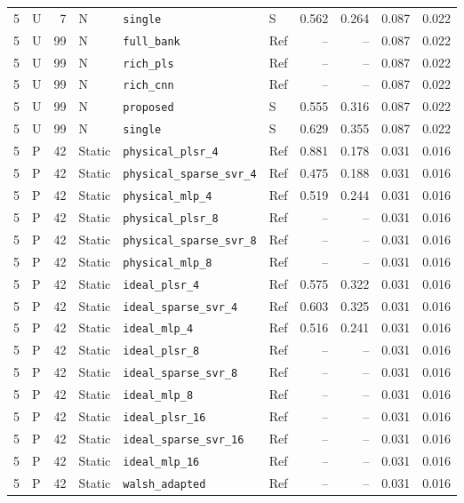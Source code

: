 \documentclass[10pt,a4paper]{article}
\begin{document}
\begin{longtable}{rlrlllrrrr}
5 & U & 7 & N & \texttt{single} & S & 0.562 & 0.264 & 0.087 & 0.022 \\
5 & U & 99 & N & \texttt{full\_bank} & Ref & -- & -- & 0.087 & 0.022 \\
5 & U & 99 & N & \texttt{rich\_pls} & Ref & -- & -- & 0.087 & 0.022 \\
5 & U & 99 & N & \texttt{rich\_cnn} & Ref & -- & -- & 0.087 & 0.022 \\
5 & U & 99 & N & \texttt{proposed} & S & 0.555 & 0.316 & 0.087 & 0.022 \\
5 & U & 99 & N & \texttt{single} & S & 0.629 & 0.355 & 0.087 & 0.022 \\
5 & P & 42 & Static & \texttt{physical\_plsr\_4} & Ref & 0.881 & 0.178 & 0.031 & 0.016 \\
5 & P & 42 & Static & \texttt{physical\_sparse\_svr\_4} & Ref & 0.475 & 0.188 & 0.031 & 0.016 \\
5 & P & 42 & Static & \texttt{physical\_mlp\_4} & Ref & 0.519 & 0.244 & 0.031 & 0.016 \\
5 & P & 42 & Static & \texttt{physical\_plsr\_8} & Ref & -- & -- & 0.031 & 0.016 \\
5 & P & 42 & Static & \texttt{physical\_sparse\_svr\_8} & Ref & -- & -- & 0.031 & 0.016 \\
5 & P & 42 & Static & \texttt{physical\_mlp\_8} & Ref & -- & -- & 0.031 & 0.016 \\
5 & P & 42 & Static & \texttt{ideal\_plsr\_4} & Ref & 0.575 & 0.322 & 0.031 & 0.016 \\
5 & P & 42 & Static & \texttt{ideal\_sparse\_svr\_4} & Ref & 0.603 & 0.325 & 0.031 & 0.016 \\
5 & P & 42 & Static & \texttt{ideal\_mlp\_4} & Ref & 0.516 & 0.241 & 0.031 & 0.016 \\
5 & P & 42 & Static & \texttt{ideal\_plsr\_8} & Ref & -- & -- & 0.031 & 0.016 \\
5 & P & 42 & Static & \texttt{ideal\_sparse\_svr\_8} & Ref & -- & -- & 0.031 & 0.016 \\
5 & P & 42 & Static & \texttt{ideal\_mlp\_8} & Ref & -- & -- & 0.031 & 0.016 \\
5 & P & 42 & Static & \texttt{ideal\_plsr\_16} & Ref & -- & -- & 0.031 & 0.016 \\
5 & P & 42 & Static & \texttt{ideal\_sparse\_svr\_16} & Ref & -- & -- & 0.031 & 0.016 \\
5 & P & 42 & Static & \texttt{ideal\_mlp\_16} & Ref & -- & -- & 0.031 & 0.016 \\
5 & P & 42 & Static & \texttt{walsh\_adapted} & Ref & -- & -- & 0.031 & 0.016 \\

\end{longtable}
\end{document}
